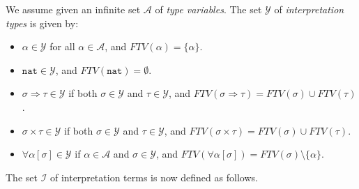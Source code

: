 \documentclass[runningheads,a4paper]{llncs}
\newcommand{\Iterms}{\mathcal{I}}
\newcommand{\Typevars}{\mathcal{A}}
\newcommand{\ITypes}{\mathcal{Y}}
\newcommand{\quant}[2]{\forall #1[#2]}
\newcommand{\arrtype}{\Rightarrow}
\newcommand{\FTV}{\mathit{FTV}}
\newcommand{\nat}{\mathtt{nat}}
\begin{document}
\begin{definition}\label{def:itypes}
We assume given an infinite set $\Typevars$ of \emph{type variables}.
The set $\ITypes$ of \emph{interpretation types} is given by:
\begin{itemize}
\item $\alpha \in \ITypes$ for all $\alpha \in \Typevars$, and
  $\FTV(\alpha) = \{ \alpha \}$.
\item $\nat \in \ITypes$, and $\FTV(\nat) = \emptyset$.
\item $\sigma \arrtype \tau \in \ITypes$ if both $\sigma \in \ITypes$
  and $\tau \in \ITypes$, and $\FTV(\sigma \arrtype \tau) = \FTV(\sigma)
  \cup \FTV(\tau)$.
\item $\sigma \times \tau \in \ITypes$ if both $\sigma \in \ITypes$
  and $\tau \in \ITypes$, and $\FTV(\sigma \times \tau) = \FTV(\sigma)
  \cup \FTV(\tau)$.
\item $\quant{\alpha}{\sigma} \in \ITypes$ if $\alpha \in \Typevars$ and
  $\sigma \in \ITypes$, and $\FTV(\quant{\alpha}{\sigma}) =
  \FTV(\sigma) \setminus \{ \alpha \}$.
\end{itemize}
\end{definition}

The set $\Iterms$ of interpretation terms is now defined as follows.
\end{document}
